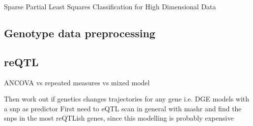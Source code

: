\begin{outline}
 Sparse Partial Least Squares Classification for High Dimensional Data 

\subsection{Genotype data preprocessing}

%
%
%
%

\subsection{reQTL}



ANCOVA vs repeated measures vs mixed model


Then work out if genetics changes trajectories for any gene i.e. DGE models with a snp as predictor
First need to eQTL scan in general with mashr and find the snps in the most reQTLish genes, since this modelling is probably expensive


\end{outline}
